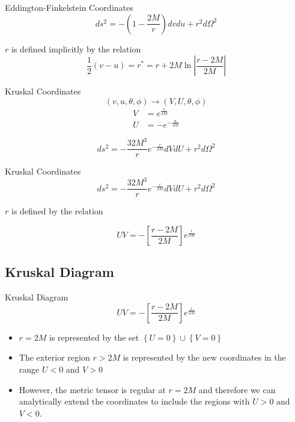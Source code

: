 \documentclass{beamer}
\begin{document}
        \begin{frame}{Eddington-Finkelstein Coordinates}
            $$ ds^2=-\left(1-\frac{2M}{r}\right)dvdu + r^2 d\Omega^{2} $$
            \pause
            \bigskip
            
            $r$ is defined implicitly by the relation
			$$\frac{1}{2}\left(v-u\right)=r^{*}=r+2M\ln\left|\frac{r-2M}{2M}\right|
$$        
        \end{frame}
        
        \begin{frame}{Kruskal Coordinates}
            $$ (v, u, \theta, \phi) \longrightarrow (V, U, \theta, \phi) $$
            \pause
            	\begin{align*}
					V & =  e^{\frac{v}{4M}}\\
					U & =  -e^{-\frac{u}{4M}}
				\end{align*}
            \pause
            \bigskip
            
            $$ ds^2 = -\frac{32M^3}{r} e^{-\frac{r}{2M}} dVdU + r^2 d\Omega^{2} $$
        \end{frame}
        
    	\begin{frame}{Kruskal Coordinates}
            $$ ds^2 = -\frac{32M^3}{r} e^{-\frac{r}{2M}} dVdU + r^2 d\Omega^{2} $$
            \pause
            
            $r$ is defined by the relation

			$$ UV =  -\left[\frac{r-2M}{2M}\right] e^{\frac{r}{2M}} $$
        \end{frame}
        
	\subsection{Kruskal Diagram}
        \begin{frame}{Kruskal Diagram}
            $$ UV =  -\left[\frac{r-2M}{2M}\right] e^{\frac{r}{2M}} $$
            \pause
            \begin{itemize}
            \item $r=2M$ is represented by the set $\left\{ U=0\right\} \cup\left\{V=0\right\} $
            \pause
            \item The exterior region $r>2M$ is represented by the new coordinates in the range $U<0$ and $V>0$
            \pause
            \item However, the metric tensor is regular at $r=2M$ and therefore we can analytically extend the coordinates to include the regions with $U>0$ and $V<0$.
            \end{itemize}
      	\end{frame}
        
\end{document}
